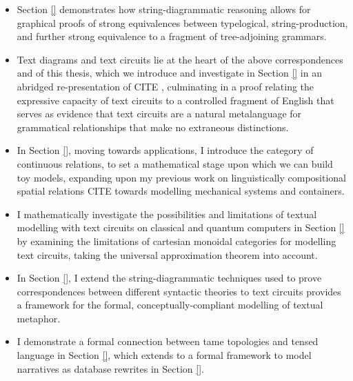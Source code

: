 {
 \begin{itemize}
\item
Section \ref{} demonstrates how string-diagrammatic reasoning allows for graphical proofs of strong equivalences between typelogical, string-production, and further strong equivalence to a fragment of tree-adjoining grammars. 
\item
Text diagrams and text circuits lie at the heart of the above correspondences and of this thesis, which we introduce and investigate in Section \ref{} in an abridged re-presentation of \bR CITE \e, culminating in a proof relating the expressive capacity of text circuits to a controlled fragment of English that serves as evidence that text circuits are a natural metalanguage for grammatical relationships that make no extraneous distinctions.
\item
In Section \ref{}, moving towards applications, I introduce the category of continuous relations, to set a mathematical stage upon which we can build toy models, expanding upon my previous work on linguistically compositional spatial relations \bR CITE \e towards modelling mechanical systems and containers.
\item
I mathematically investigate the possibilities and limitations of textual modelling with text circuits on classical and quantum computers in Section \ref{} by examining the limitations of cartesian monoidal categories for modelling text circuits, taking the universal approximation theorem into account.
\item
In Section \ref{}, I extend the string-diagrammatic techniques used to prove correspondences between different syntactic theories to text circuits provides a framework for the formal, conceptually-compliant modelling of textual metaphor.
\item
I demonstrate a formal connection between tame topologies and tensed language in Section \ref{}, which extends to a formal framework to model narratives as database rewrites in Section \ref{}.
\end{itemize}
}




